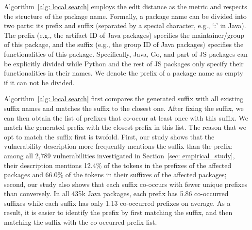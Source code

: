 Algorithm~\ref{alg: local search} employs the edit distance as the metric and respects the structure of the package name. Formally, a package name can be divided into two parts: its prefix and suffix (separated by a special character, e.g., `:' in Java).
The prefix (e.g., the artifact ID of Java packages) specifies the maintainer/group of this package, and the suffix (e.g., the group ID of Java packages) specifies the functionalities of this package.
Specifically, Java, Go, and part of JS packages can be explicitly divided while Python and the rest of JS packages only specify their functionalities in their names.
We denote the prefix of a package name as empty if it can not be divided.

Algorithm~\ref{alg: local search} first compares the generated suffix with all existing suffix names and matches the suffix to the closest one. After fixing the suffix, we can then obtain the list of prefixes that co-occur at least once with this suffix. We match the generated prefix with the closest prefix in this list.
The reason that we opt to match the suffix first is twofold. First, our study shows that the vulnerability description more frequently mentions the suffix than the prefix: among all 2,789 vulnerabilities investigated in Section~\ref{sec: empirical_study}, their description mentions 12.4\% of the tokens in the prefixes of the affected packages and 66.0\% of the tokens in their suffixes of the affected packages;
second, our study also shows that each suffix co-occurs with fewer unique prefixes than conversely.
In all 435k Java packages, each prefix has 5.86 co-occurred suffixes while each suffix has only 1.13 co-occurred prefixes on average.
As a result, it is easier to identify the prefix by first matching the suffix, and then matching the suffix with the co-occurred prefix list. 




